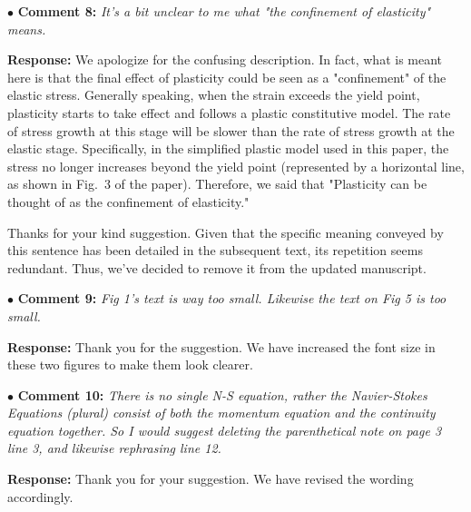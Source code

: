 \documentclass[12pt,a4paper]{article}
\begin{document}

\vspace{0.4cm}
\noindent$\bullet$ \enspace \textbf{Comment 8:}
\textit{It's a bit unclear to me what "the confinement of elasticity" means. }

\vspace{0.2cm}
\textbf{Response:}
We apologize for the confusing description. In fact, what is meant here is that the final effect of plasticity could be seen as a "confinement" of the elastic stress. Generally speaking, when the strain exceeds the yield point, plasticity starts to take effect and follows a plastic constitutive model. The rate of stress growth at this stage will be slower than the rate of stress growth at the elastic stage. Specifically, in the simplified plastic model used in this paper, the stress no longer increases beyond the yield point (represented by a horizontal line, as shown in Fig.~3 of the paper). Therefore, we said that "Plasticity can be thought of as the confinement of elasticity."

Thanks for your kind suggestion. Given that the specific meaning conveyed by this sentence has been detailed in the subsequent text, its repetition seems redundant. Thus, we've decided to remove it from the updated manuscript.


\vspace{0.4cm}
\noindent$\bullet$ \enspace \textbf{Comment 9:}
\textit{Fig 1's text is way too small. Likewise the text on Fig 5 is too small. }

\vspace{0.2cm}
\textbf{Response:}
Thank you for the suggestion. We have increased the font size in these two figures to make them look clearer.


\vspace{0.4cm}
\noindent$\bullet$ \enspace \textbf{Comment 10:}
\textit{ There is no single N-S equation, rather the Navier-Stokes Equations (plural) consist of both the momentum equation and the continuity equation together. So I would suggest deleting the parenthetical note on page 3 line 3, and likewise rephrasing line 12. }

\vspace{0.2cm}
\textbf{Response:}
Thank you for your suggestion. We have revised the wording accordingly.
\end{document}
